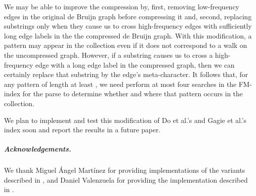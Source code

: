 \documentclass[a4paper,UKenglish]{lipics-v2016}
\begin{document}
We may be able to improve the compression by, first, removing low-frequency edges in the original de Bruijn graph before compressing it and, second, replacing substrings only when they cause us to cross high-frequency edges with sufficiently long edge labels in the the compressed de Bruijn graph.  With this modification, a pattern may appear in the collection even if it does not correspond to a walk on the uncompressed graph.  However, if a substring causes us to cross a high-frequency edge with a long edge label in the compressed graph, then we can certainly replace that substring by the edge's meta-character.  It follows that, for any pattern of length at least , we need perform at most four searches in the FM-index for the parse to determine whether and where that pattern occurs in the collection.

We plan to implement and test this modification of Do et al.'s and Gagie et al.'s index soon and report the results in a future paper.



































\subparagraph*{Acknowledgements.}

We thank Miguel \'{A}ngel Mart\'{i}nez for providing implementations of the variants described in \cite{kreft2010self}, and Daniel Valenzuela for providing the implementation described in \cite{valenzuela2016chico}.
\end{document}
